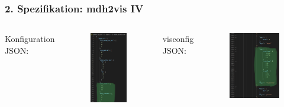 \documentclass{presentation}
\begin{document}
\begin{frame}
	\frametitle{2. Spezifikation: mdh2vis IV}
	\begin{columns}
		Konfiguration JSON:
		\begin{figure}
			\includegraphics[width=0.54\linewidth]{images/gemm_tps.png}
		\end{figure}
		visconfig JSON:
		\begin{figure}
			\includegraphics[width=0.8\linewidth]{images/gemm_tps_vis.png}
		\end{figure}
	\end{columns}
\end{frame}
\end{document}
